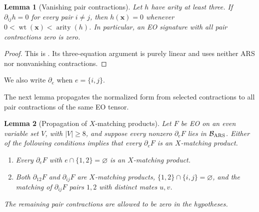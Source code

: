 \documentclass[11pt,letterpaper,onecolumn]{article}
\theoremstyle{plain}
\newtheorem{lemma}[lemma]{Lemma}
\theoremstyle{definition}
\theoremstyle{remark}
\newcommand{\wt}{\operatorname{wt}}
\newcommand{\arity}{\operatorname{arity}}
\begin{document}
	\begin{lemma}[Vanishing pair contractions]
		\label{lem:wt-zero-loop}
		Let \(h\) have arity at least three.  If \(\partial_{ij}h=0\) for every
		pair \(i\ne j\), then \(h({\mathbf x})=0\) whenever
		\(0<\wt({\mathbf x})<\arity(h)\).
		In particular, an EO signature with all pair contractions zero is zero.
	\end{lemma}
	
	\begin{proof}
		This is \cite[Lemma~2.7]{CaiFuShao2020ARS}. Its three-equation
		argument is purely linear and uses neither ARS nor nonvanishing contractions.
	\end{proof}
	
	We also write \(\partial_e\) when \(e=\{i,j\}\).
	
	The next lemma propagates the normalized form from selected contractions
	to all pair contractions of the same EO tensor.
	\begin{lemma}[Propagation of \(X\)-matching products]
		\label{lem:hc-x-line-propagation}
		Let \(F\) be EO on an even variable set \(V\), with \(|V|\ge8\), and suppose
		every nonzero \(\partial_eF\) lies in \(\mathcal B_{\rm ARS}\).
		Either of the following conditions implies that every \(\partial_eF\)
		is an \(X\)-matching product.
		\begin{enumerate}
			\item Every \(\partial_eF\) with \(e\cap\{1,2\}=\varnothing\) is an
			\(X\)-matching product.
			\item Both \(\partial_{12}F\) and \(\partial_{ij}F\) are
			\(X\)-matching products,
			\(\{1,2\}\cap\{i,j\}=\varnothing\), and the matching of
			\(\partial_{ij}F\) pairs \(1,2\) with distinct mates \(u,v\).
		\end{enumerate}
		The remaining pair contractions are allowed to be zero in the hypotheses.
	\end{lemma}
	
\end{document}
